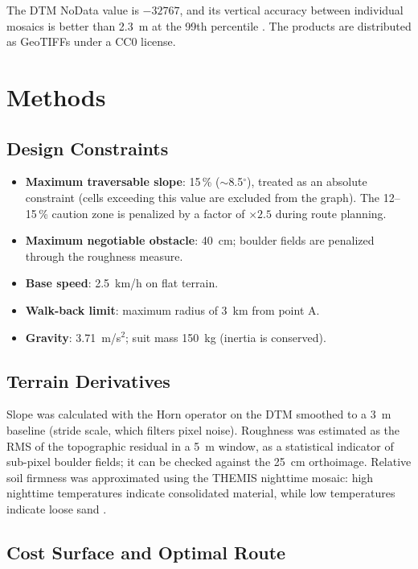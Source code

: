 \documentclass{article}
\begin{document}
The DTM NoData value is $-32767$, and its vertical accuracy between individual mosaics is better than 2.3~m at the 99th percentile \citep{usgs2024}. The products are distributed as GeoTIFFs under a CC0 license.

\newpage

\section{Methods}

\subsection{Design Constraints}

\begin{itemize}
    \item \textbf{Maximum traversable slope}: 15\,\% ($\sim$8.5$^{\circ}$), treated as an absolute constraint (cells exceeding this value are excluded from the graph). The 12--15\,\% caution zone is penalized by a factor of $\times 2.5$ during route planning.
    \item \textbf{Maximum negotiable obstacle}: 40~cm; boulder fields are penalized through the roughness measure.
    \item \textbf{Base speed}: 2.5~km/h on flat terrain.
    \item \textbf{Walk-back limit}: maximum radius of 3~km from point A.
    \item \textbf{Gravity}: 3.71~m/s$^2$; suit mass 150~kg (inertia is conserved).
\end{itemize}

\subsection{Terrain Derivatives}

Slope was calculated with the Horn operator on the DTM smoothed to a 3~m baseline (stride scale, which filters pixel noise). Roughness was estimated as the RMS of the topographic residual in a 5~m window, as a statistical indicator of sub-pixel boulder fields; it can be checked against the 25~cm orthoimage. Relative soil firmness was approximated using the THEMIS nighttime mosaic: high nighttime temperatures indicate consolidated material, while low temperatures indicate loose sand \citep{usgs2018}.

\subsection{Cost Surface and Optimal Route}
\end{document}
